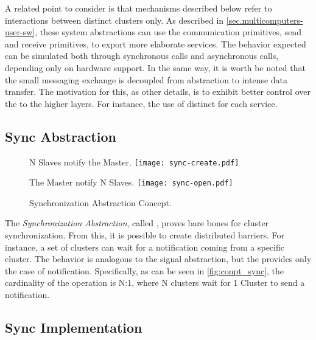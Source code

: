 		A related point to consider is that mechanisms described below refer
		to interactions between distinct clusters only.
		As described in \autoref{sec.multicomputers-user-sw}, these system
		abstractions can use the communication primitives, \ie send and receive
		primitives, to export more elaborate services.
		The behavior expected can be simulated both through synchronous calls
		and asynchronous calls, depending only on hardware support.
		In the same way, it is worth be noted that the small messaging exchange
		is decoupled from abstraction to intense data transfer.
		The motivation for this, as other details, is to exhibit better control
		over the \qos to the higher layers.
		For instance, the use of distinct \nocs for each service.

		\subsection{Sync Abstraction}
		\label{sec.sync-abs}

			\begin{figure}[!tb]
				\centering%
				\caption{Synchronization Abstraction Concept.}%
				\label{fig:conpt_sync}%

					{N Slaves notify the Master.}%
					{\texttt{[image: sync-create.pdf]}}%

				\hfill

					{The Master notify N Slaves.}%
					{\texttt{[image: sync-open.pdf]}}%

			\end{figure}


			The \textit{Synchronization Abstraction}, called \sync, proves bare bones
			for cluster synchronization.
			From this, it is possible to create distributed barriers.
			For instance, a set of clusters can wait for a notification coming
			from a specific cluster.
			The behavior is analogous to the \posix signal abstraction, but the \sync
			provides only the case of notification.
			Specifically, as can be seen in \autoref{fig:conpt_sync}, the
			cardinality of the operation is N:1, where N clusters wait for 1 Cluster
			to send a notification.

			\subsection*{Sync Implementation}

